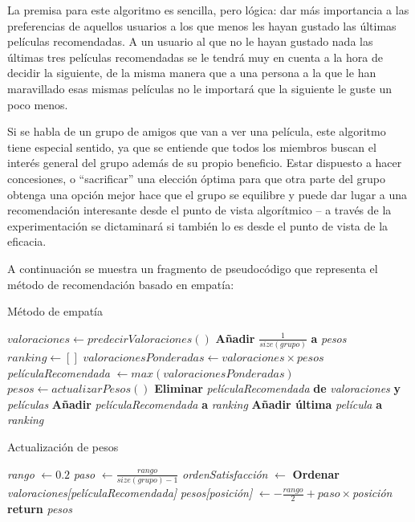 La premisa para este algoritmo es sencilla, pero lógica: dar más importancia a las preferencias de aquellos usuarios a los que menos les hayan gustado las últimas películas recomendadas. A un usuario al que no le hayan gustado nada las últimas tres películas recomendadas se le tendrá muy en cuenta a la hora de decidir la siguiente, de la misma manera que a una persona a la que le han maravillado esas mismas películas no le importará que la siguiente le guste un poco menos.

Si se habla de un grupo de amigos que van a ver una película, este algoritmo tiene especial sentido, ya que se entiende que todos los miembros buscan el interés general del grupo además de su propio beneficio. Estar dispuesto a hacer concesiones, o ``sacrificar'' una elección óptima para que otra parte del grupo obtenga una opción mejor hace que el grupo se equilibre y puede dar lugar a una recomendación interesante desde el punto de vista algorítmico -- a través de la experimentación se dictaminará si también lo es desde el punto de vista de la eficacia.

A continuación se muestra un fragmento de pseudocódigo que representa el método de recomendación basado en empatía:
\newpage

\begin{algorithm}
	\caption{Método de empatía}
	\begin{algorithmic}[1]
		\State $valoraciones \gets predecirValoraciones()$
		\State \textbf{Añadir} $\frac{1}{size(grupo)}$ \textbf{a} \textit{pesos}
		\EndFor
		\State $ranking \gets []$
		\State $valoracionesPonderadas \gets valoraciones \times pesos$
		\State \textit{películaRecomendada} $ \gets max(valoracionesPonderadas)$
		\State $pesos \gets actualizarPesos()$
		\State \textbf{Eliminar} \textit{películaRecomendada} \textbf{de} \textit{valoraciones} \textbf{y} \textit{películas}
		\State \textbf{Añadir} \textit{películaRecomendada} \textbf{a} \textit{ranking}
		\EndWhile
		\State \textbf{Añadir última} \textit{película} \textbf{a} \textit{ranking}
	\end{algorithmic}
\end{algorithm}

\begin{algorithm}
	\caption{Actualización de pesos}
	\begin{algorithmic}[1]
		\State \textit{rango} $\gets 0.2$
		\State \textit{paso} $\gets \frac{rango}{size(grupo) - 1}$
		\State \textit{ordenSatisfacción} $\gets$ \textbf{Ordenar} \textit{valoraciones[películaRecomendada]}
		\State \textit{pesos[posición]} $\gets -\frac{rango}{2} + paso \times $\textit{posición}
		\EndFor
		\State \textbf{return} \textit{pesos}
	\end{algorithmic}
\end{algorithm}

